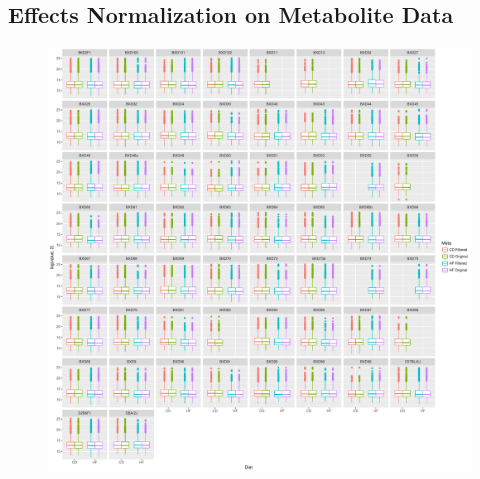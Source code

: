 \documentclass[a4paper,11pt,twoside]{book}
\begin{document}
\begin{subappendices}
\section{Effects Normalization on Metabolite Data}
\begin{figure}[ht!b]
	\centering
	\includegraphics[width=\linewidth]{Appendix_FIgures/Strain_Wise_Diet_Filt.pdf}
\end{figure}
\clearpage


\end{subappendices}
\end{document}
